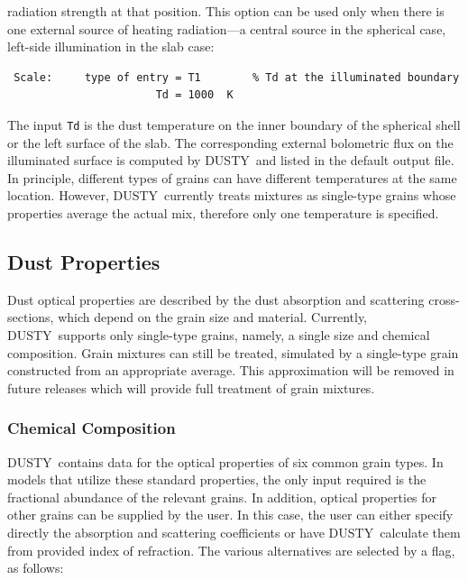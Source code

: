 \documentclass[11pt]{article}
\def\D    {{\sf DUSTY}}
\begin{document}
\begin{itemize}
  radiation strength at that position. This option can be used only
  when there is one external source of heating radiation---a central
  source in the spherical case, left-side illumination in the slab
  case:
\begin{verbatim}
 Scale:     type of entry = T1        % Td at the illuminated boundary
                       Td = 1000  K
\end{verbatim}
  The input {\tt Td} is the dust temperature on the inner boundary of
  the spherical shell or the left surface of the slab. The
  corresponding external bolometric flux on the illuminated surface is
  computed by \D\ and listed in the default output file. In principle,
  different types of grains can have different temperatures at the
  same location. However, \D\ currently treats mixtures as single-type
  grains whose properties average the actual mix, therefore only one
  temperature is specified.
\end{itemize}

\subsection{Dust Properties}

Dust optical properties are described by the dust absorption and
scattering cross-sections, which depend on the grain size and
material. Currently, \D\ supports only single-type grains, namely, a
single size and chemical composition.  Grain mixtures can still be
treated, simulated by a single-type grain constructed from an
appropriate average.  This approximation will be removed in future
releases which will provide full treatment of grain mixtures.

\subsubsection{Chemical Composition}
\label{chemistry}

\D\ contains data for the optical properties of six common grain
types.  In models that utilize these standard properties, the only
input required is the fractional abundance of the relevant grains.  In
addition, optical properties for other grains can be supplied by the
user.  In this case, the user can either specify directly the
absorption and scattering coefficients or have \D\ calculate them from
provided index of refraction. The various alternatives are selected by
a flag, as follows:
\end{document}
